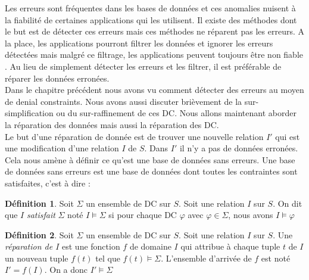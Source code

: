 \documentclass[letterpaper, 12pt]{report}
\theoremstyle{definition}
\newtheorem{mydef}{Définition}
\begin{document}
Les erreurs sont fréquentes dans les bases de données et ces anomalies nuisent à la fiabilité de certaines applications qui les utilisent. Il existe des méthodes dont le but est de détecter ces erreurs mais ces méthodes ne réparent pas les erreurs. A la place, les applications pourront filtrer les données et ignorer les erreurs détectées mais malgré ce filtrage, les applications peuvent toujours être non fiable \cite{anodetect}. Au lieu de simplement détecter les erreurs et les filtrer, il est préférable de réparer les données erronées.\\

Dans le chapitre précédent nous avons vu comment détecter des erreurs au moyen de denial constraints. Nous avons aussi discuter brièvement de la sur-simplification ou du sur-raffinement de ces DC. Nous allons maintenant aborder la réparation des données mais aussi la réparation des DC.\\

%

Le but d'une réparation de donnée est de trouver une nouvelle relation $I'$ qui est une modification d'une relation $I$ de $S$. Dans $I'$ il n'y a pas de données erronées. Cela nous amène à définir ce qu'est une base de données sans erreurs. Une base de données sans erreurs est une base de données dont toutes les contraintes sont satisfaites, c'est à dire : \\

\begin{mydef}
	Soit $\Sigma$ un ensemble de DC sur $S$. Soit une relation $I$ sur $S$. On dit que $I$ \emph{satisfait} $\Sigma$ noté $I \models \Sigma$ si pour chaque DC $\varphi$ avec $\varphi \in \Sigma$, nous avons $I \models \varphi$
\end{mydef}

\begin{mydef}
	Soit $\Sigma$ un ensemble de DC sur $S$. Soit une relation $I$ sur $S$. Une \emph{réparation de $I$} est une fonction $f$ de domaine $I$ qui attribue à chaque tuple $t$ de $I$ un nouveau tuple $f(t)$ tel que $f(t) \models \Sigma$. L'ensemble d'arrivée de $f$ est noté $I'=f(I)$. On a donc $I' \models \Sigma$
\end{mydef}
\end{document}
